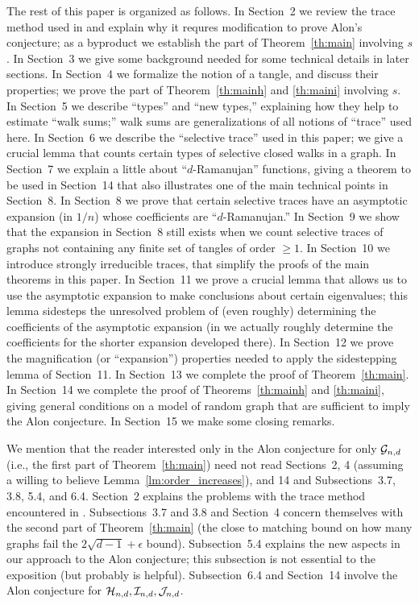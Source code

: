 \documentclass[12pt]{article}
\newcommand{\dtreelike}{{$d$-Ramanujan}}
\newcommand{\cg}{{\cal G}}
\newcommand{\ch}{{\cal H}}
\newcommand{\ci}{{\cal I}}
\newcommand{\cj}{{\cal J}}
\newcommand{\cjnd}{\cj_{n,d}}
\newcommand{\cind}{\ci_{n,d}}
\newcommand{\cgnd}{\cg_{n,d}}
\newcommand{\chnd}{\ch_{n,d}}
\begin{document}
The rest of this paper is organized as follows.  In Section~2 we
review the trace method used in \cite{friedman_random_graphs} and
explain why it requres modification to prove Alon's conjecture; as a
byproduct we establish the part of Theorem~\ref{th:main} involving
$s$.  In Section~3 we give some background needed for some technical
details in later sections.  In Section~4 we formalize the notion of a
tangle, and discuss their properties; we prove the part
of Theorem~\ref{th:mainh} and \ref{th:maini}
involving $s$.  In Section~5 we describe
``types'' and ``new types,'' explaining how they help to estimate
``walk sums;'' walk sums are generalizations of all notions of ``trace''
used here.  In Section~6 we describe the ``selective trace'' used in
this paper; we give a crucial
lemma that counts certain types of selective closed walks in a graph.
In Section~7 we explain a little about ``{\dtreelike}'' functions, giving
a theorem to be used in Section~14 that also illustrates one of the main
technical points in Section~8.  
In Section~8 we prove that certain selective traces have an asymptotic
expansion (in $1/n$) whose coefficients are ``\dtreelike.''
In Section~9 we show that the expansion in Section~8 still exists when
we count selective traces of graphs not containing any finite set of
tangles of order $\ge 1$.
In Section~10 we introduce strongly irreducible traces, that simplify
the proofs of the main theorems in this paper.  
In Section~11 we prove a
crucial lemma that allows us to use the asymptotic expansion
to make conclusions about
certain eigenvalues; this lemma sidesteps the unresolved problem of
(even roughly) determining the coefficients of the asymptotic expansion
(in \cite{friedman_random_graphs} we actually roughly
determine the coefficients for the shorter expansion developed there).
In Section~12 we prove
the magnification (or ``expansion'') properties needed to apply the
sidestepping lemma of Section~11.
In Section~13 we complete the proof of Theorem~\ref{th:main}.
In Section~14 we complete the proof of Theorems~\ref{th:mainh} and
\ref{th:maini}, giving general conditions on a model of random graph
that are sufficient to imply the Alon conjecture.
In Section~15 we make some closing remarks.

We mention that the reader interested only in the Alon conjecture
for only $\cgnd$
(i.e., the first part of Theorem~\ref{th:main}) need not read
Sections~2, 4 (assuming a willing to
believe Lemma~\ref{lm:order_increases}), and 14 and
Subsections~3.7, 3.8, 5.4, and 6.4.
Section~2 explains the problems with the trace method encountered
in \cite{friedman_random_graphs}.  Subsections~3.7 and 3.8 and 
Section~4 concern
themselves with the second part of Theorem~\ref{th:main} (the close
to matching bound on how many graphs fail the $2\sqrt{d-1}+\epsilon$
bound).  Subsection~5.4 explains the new aspects in our approach to
the Alon conjecture; this subsection is not essential
to the exposition (but probably is helpful).  Subsection~6.4 and 
Section~14
involve the Alon conjecture for $\chnd,\cind,\cjnd$.
\end{document}
